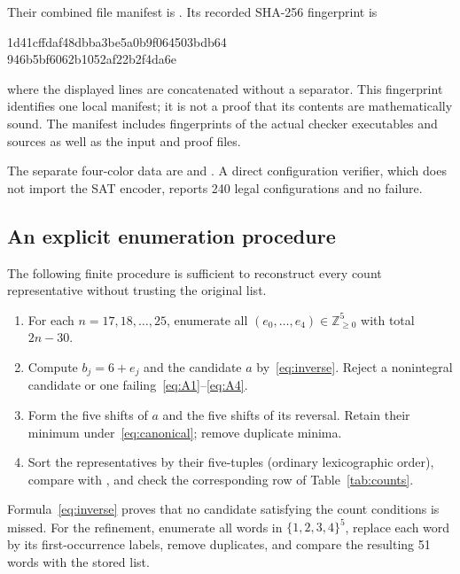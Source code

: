 \begin{samepage}
Their combined file manifest is .
Its recorded SHA-256 fingerprint is
\begin{center}\small\ttfamily
1d41cffdaf48dbba3be5a0b9f064503bdb64\\
946b5bf6062b1052af22b2f4da6e
\end{center}
where the displayed lines are concatenated without a separator. This
fingerprint identifies one local manifest; it is not a proof that its
contents are mathematically sound. The manifest includes fingerprints of
the actual checker executables and sources as well as the input and proof
files.
\end{samepage}

The separate four-color data are
 and
. A direct
configuration verifier, which does not import the SAT encoder, reports
240 legal configurations and no failure.

\subsection{An explicit enumeration procedure}
The following finite procedure is sufficient to reconstruct every count
representative without trusting the original list.
\begin{enumerate}
\item For each $n=17,18,\ldots,25$, enumerate all
$(e_0,\ldots,e_4)\in\mathbb Z_{\geq0}^5$ with total $2n-30$.
\item Compute $b_j=6+e_j$ and the candidate $a$ by~\eqref{eq:inverse}.
Reject a nonintegral candidate or one failing~\eqref{eq:A1}--\eqref{eq:A4}.
\item Form the five shifts of $a$ and the five shifts of its reversal.
Retain their minimum under~\eqref{eq:canonical}; remove duplicate minima.
\item Sort the representatives by their five-tuples (ordinary lexicographic
order), compare with , and check
the corresponding row of Table~\ref{tab:counts}.
\end{enumerate}
Formula~\eqref{eq:inverse} proves that no candidate satisfying the count
conditions is missed. For the refinement, enumerate all words in
$\{1,2,3,4\}^5$, replace each word by its first-occurrence labels, remove
duplicates, and compare the resulting 51 words with the stored list.

